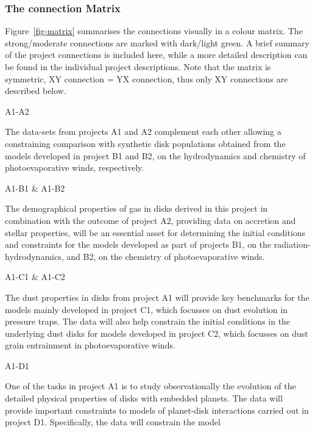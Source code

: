 \documentclass[10pt,fleqn,twoside,a4paper]{article}
\begin{document}
\subsubsection{The connection Matrix}
\label{sub-matrix}
Figure~\ref{fig-matrix} summarises the connections visually in a
colour matrix. The strong/moderate connections are marked with
dark/light green. A brief summary of the project connections is
included here, while a more detailed description can be found in the
individual project descriptions. Note that the matrix is symmetric, XY connection = YX
connection, thus only XY connections are described below.   \\
\begin{Emphasize} A1-A2 \end{Emphasize} The 
data-sets from projects A1 and A2 complement each other allowing a
constraining comparison with synthetic disk
populations obtained from the models developed in project B1 and B2,
on the hydrodynamics and chemistry of photoevaporative winds,
respectively. \\
\begin{Emphasize} A1-B1 \& A1-B2 \end{Emphasize} The demographical properties of gas in disks
derived in this project in combination 
with the outcome of project A2, providing data on accretion and
stellar properties, will
be an essential asset for determining the initial conditions and constraints
for the models developed as part of projects B1, on the radiation-hydrodynamics, and
B2, on the chemistry of photoevaporative winds.\\
\begin{Emphasize} A1-C1 \& A1-C2 \end{Emphasize} 
The dust properties in disks from project A1 
will provide  key benchmarks for the models mainly developed in
project C1, which focusses on dust evolution in pressure traps. The
data will
also help constrain the initial conditions in the underlying dust
disks for models developed in project C2, which focusses on dust grain
entrainment in photoevaporative winds. \\
\begin{Emphasize} A1-D1 \end{Emphasize} One of the tasks
in project A1 is to study observationally the 
evolution of the detailed physical properties of disks with embedded
planets. The data will provide important constraints to models of planet-disk
interactions carried out in project D1. Specifically, the data will
constrain the model 
\end{document}
